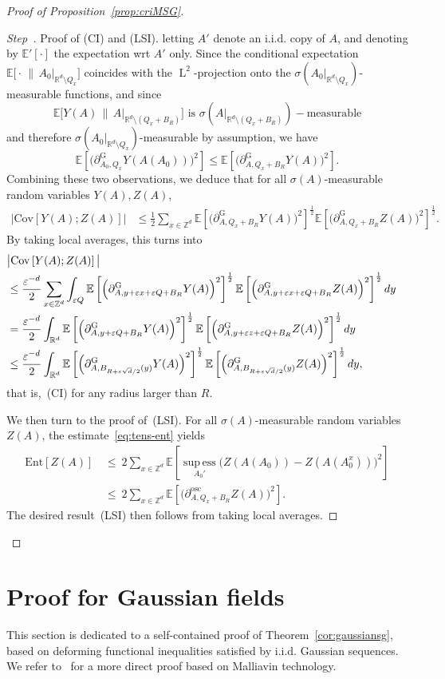 \documentclass[10pt]{amsart}
\theoremstyle{definition}\newtheorem{defi}[theo]{Definition}\newtheorem{rema}[theo]{Remark}\newtheorem{exam}[theo]{Example}\newtheorem{exem}[theo]{Example}\newtheorem{nota}[theo]{Notation}
\newcommand{\R}{\mathbb R}
\newcommand{\Z}{\mathbb Z}
\newcommand{\expec}[1]{\mathbb{E}\left[#1 \right]}
\newcommand{\expecp}[1]{\mathbb{E}'\left[#1 \right]}
\newcommand{\expeCm}[2]{\mathbb{E}\big[#1 \,\big\|\,#2\big]}
\newcommand{\e}{\varepsilon}
\DeclareMathOperator{\supess}{sup\,ess}
\DeclareMathOperator{\Ld}{L}
\newcommand{\supessd}[1]{\mathrel{\mathop{\supess}\limits_{#1}}}
\newcommand{\parG}[1]{\partial_{#1}^{\operatorname{G}}}
\newcommand{\osc}{\partial^{\mathrm{osc}}}
\newcommand{\oscd}[1]{\mathrel{\osc_{#1}}}
\newcommand{\ent}[1]{\mathrm{Ent}\!\left[#1\right]}
\newcommand{\cov}[2]{\mathrm{Cov}\left[#1;#2\right]}
\newcounter{stepcount}
\newenvironment{step}{\refstepcounter{stepcount}\begin{proof}[Step~\thestepcount]}{\let\qed\relax\end{proof}}
\begin{document}
\begin{proof}[Proof of Proposition~\ref{prop:criMSG}]
\begin{step}{Proof of (CI) and (LSI).}
letting $A'$ denote an i.i.d. copy of $A$, and denoting by $\expecp{\cdot}$ the expectation wrt $A'$ only. Since the conditional expectation $\expeCm{\cdot}{A_0|_{\R^d\setminus Q_x}}$ coincides with the $\Ld^2$-projection onto the $\sigma(A_0|_{\R^d\setminus Q_x})$-measurable functions, and since
\[
\expeCm{Y(A)}{A|_{\R^d\setminus (Q_x+B_R)}} \text{ is }\sigma\left(A|_{\R^d\setminus(Q_x+B_R)}\right)-\text{measurable}
\]
and therefore $\sigma(A_0|_{\R^d\setminus Q_x})$-measurable by assumption, we have
\[
\expec{\Big(\parG{A_0,Q_x}Y(A(A_0))\Big)^2}\le\expec{\Big(\parG{A,Q_x+B_R}Y(A)\Big)^2}.
\]
Combining these two observations, we deduce that for all $\sigma(A)$-measurable random variables $Y(A),Z(A)$,
\begin{align*}
\big|\cov{Y(A)}{Z(A)}\big|&\le\frac12\sum_{x\in\Z^d}\expec{\Big(\parG{A,Q_x+B_R}Y(A)\Big)^2}^\frac12\expec{\Big(\parG{A,Q_x+B_R}Z(A)\Big)^2}^\frac12.
\end{align*}
By taking local averages, this turns into
\begin{align*}
\lefteqn{\big|\cov{Y(A)}{Z(A)}\big|}
\\
&\le\frac{\e^{-d}}2\sum_{x\in\Z^d}\int_{\e Q}\expec{\Big(\parG{A,y+\e x+\e Q+B_R}Y(A)\Big)^2}^\frac12\expec{\Big(\parG{A,y+\e x+\e Q+B_R}Z(A)\Big)^2}^\frac12dy\\
&=\frac{\e^{-d}}2\int_{\R^d}\expec{\Big(\parG{A,y+\e Q+B_R}Y(A)\Big)^2}^\frac12\expec{\Big(\parG{A,y+\e z+\e Q+B_R}Z(A)\Big)^2}^\frac12dy\\
&\le\frac{\e^{-d}}2\int_{\R^d}\expec{\Big(\parG{A,B_{R+\e\sqrt d/2}(y)}Y(A)\Big)^2}^\frac12\expec{\Big(\parG{A,B_{R+\e\sqrt d/2}(y)}Z(A)\Big)^2}^\frac12dy,
\end{align*}
that is,~(CI) for any radius larger than $R$.

\noindent We then turn to the proof of~(LSI). For all $\sigma(A)$-measurable random variables $Z(A)$, the estimate~\eqref{eq:tens-ent} yields
\begin{align*}
\ent{Z(A)}\,&\le~2\sum_{x\in\Z^d}\expec{\supessd{A_0'}\big(Z(A(A_0))-Z(A(A_0^{x}))\big)^2}
\\
&\le~2\sum_{x\in\Z^d}\expec{\Big(\oscd{A,Q_x+B_R}Z(A)\Big)^2}.
\end{align*}
The desired result~(LSI) then follows from taking local averages.
\end{step}
\end{proof}


\section{Proof for Gaussian fields}\label{chap:condunif}
This section is dedicated to a self-contained proof of Theorem~\ref{cor:gaussiansg}, based on deforming functional inequalities satisfied by i.i.d. Gaussian sequences. We refer to~\cite[Appendix~A]{DG3} for a more direct proof based on Malliavin technology.
\end{document}
